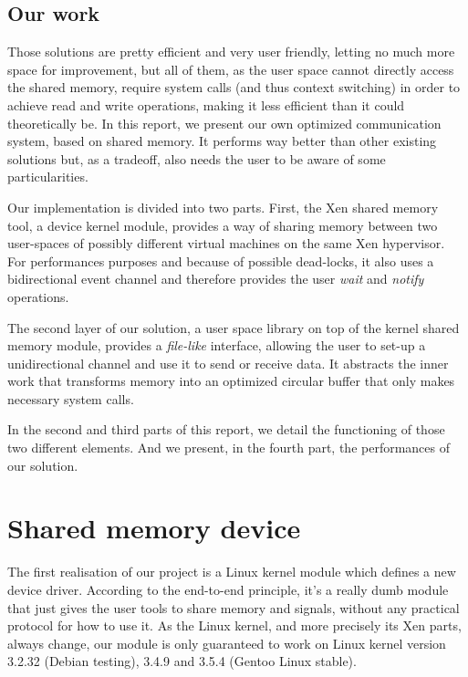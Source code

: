 \documentclass[journal]{IEEEtran}
\begin{document}
\subsection{Our work}

Those solutions are pretty efficient and very user friendly, letting no much more space for improvement, but all of them, as the user space cannot directly access the shared memory, require system calls (and thus context switching) in order to achieve read and write operations, making it less efficient than it could theoretically be. In this report, we present our own optimized communication system, based on shared memory. It performs way better than other existing solutions but, as a tradeoff, also needs the user to be aware of some particularities.



Our implementation is divided into two parts. First, the Xen shared memory tool, a device kernel module, provides a way of sharing memory between two user-spaces of possibly different virtual machines on the same Xen hypervisor. For performances purposes and because of possible dead-locks, it also uses a bidirectional event channel and therefore provides the user \emph{wait} and \emph{notify} operations.

The second layer of our solution, a user space library on top of the kernel shared memory module, provides a \emph{file-like} interface, allowing the user to set-up a unidirectional channel and use it to send or receive data. It abstracts the inner work that transforms memory into an optimized circular buffer that only makes necessary system calls.

In the second and third parts of this report, we detail the functioning of those two different elements. And we present, in the fourth part, the performances of our solution. 

\section{Shared memory device}

The first realisation of our project is a Linux kernel module which defines a new device driver. According to the end-to-end principle, it's a really dumb module that just gives the user tools to share memory and signals, without any practical protocol for how to use it. As the Linux kernel, and more precisely its Xen parts, always change, our module is only guaranteed to work on Linux kernel version 3.2.32 (Debian testing), 3.4.9 and 3.5.4 (Gentoo Linux stable).
\end{document}
